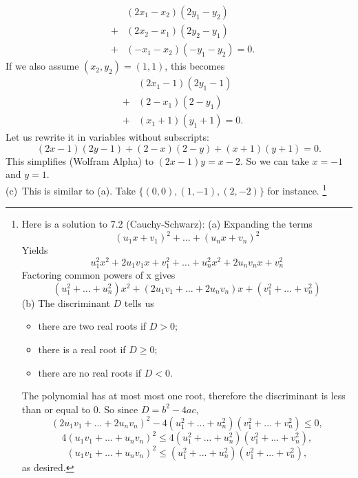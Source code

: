 \begin{multicols}{2}
{\begin{eqnarray*}
&&   (2x_1-x_2)(2y_1-y_2)\\
&+& (2x_2-x_1)(2y_2-y_1)\\
&+& (-x_1-x_2)(-y_1-y_2) = 0.
\end{eqnarray*}
If we also assume $(x_2,y_2)=(1,1)$, this becomes
\begin{eqnarray*}
&&   (2x_1-1)(2y_1-1)\\
&+& (2-x_1)(2-y_1)\\
&+& (x_1+1)(y_1+1) = 0.
\end{eqnarray*}
Let us rewrite it in variables without subscripts:
\[
   (2x-1)(2y-1)+ (2-x)(2-y)+ (x+1)(y+1) = 0.
\]
This simplifies (Wolfram Alpha) to $(2 x - 1) y = x - 2$.
So we can take $x=-1$ and $y=1$.\\
(c)~This is similar to (a). Take $\{(0,0), (1,-1), (2,-2)\}$ for instance.
\footnote{Here is a solution to 7.2 (Cauchy-Schwarz):
(a)
Expanding the terms
\[
(u_1x+v_1)^2+\dots+(u_nx+v_n)^2 
\]
Yields
\[
u_1^2x^2+2u_1v_1x+v_1^2+\dots+u_n^2x^2+2u_nv_nx+v_n^2
\]
Factoring common powers of x gives
\[
(u_1^2+\dots+u_n^2)x^2+(2u_1v_1+\dots+2u_nv_n)x+(v_1^2+\dots+v_n^2)
\]
(b)
The discriminant $D$ tells us
\begin{itemize}
\item there are two real roots if $D>0$;
\item there is a real root if $D\ge 0$;
\item there are no real roots if $D<0$.
\end{itemize}
The polynomial has at most most one root, therefore the discriminant is less than or equal to 0.
So since $D=b^2-4ac$,
\[
(2u_1v_1+...+2u_nv_n)^2-4(u_1^2+...+u_n^2)(v_1^2+...+v_n^2)\le 0,
\]
\[
4(u_1v_1+...+u_nv_n)^2\le 4(u_1^2+...+u_n^2)(v_1^2+...+v_n^2),
\]
\[
(u_1v_1+...+u_nv_n)^2\le (u_1^2+...+u_n^2)(v_1^2+...+v_n^2),
\]
as desired.}
}



\end{multicols}






